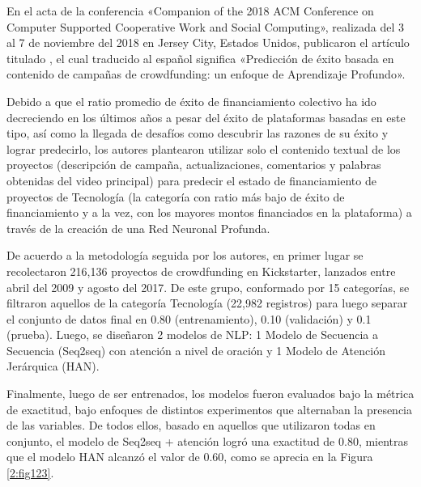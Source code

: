 En el acta de la conferencia «Companion of the 2018 ACM Conference on Computer Supported Cooperative Work and Social Computing», realizada  del 3 al 7 de noviembre del 2018 en Jersey City, Estados Unidos, \cite{pr_lee2018contentDL} publicaron el artículo titulado , el cual traducido al español significa «Predicción de éxito basada en contenido de campañas de crowdfunding: un enfoque de Aprendizaje Profundo».

Debido a que el ratio promedio de éxito de financiamiento colectivo ha ido decreciendo en los últimos años a pesar del éxito de plataformas basadas en este tipo, así como la llegada de desafíos como descubrir las razones de su éxito y lograr predecirlo, los autores plantearon utilizar solo el contenido textual de los proyectos (descripción de campaña, actualizaciones, comentarios y palabras obtenidas del video principal) para predecir el estado de financiamiento de proyectos de Tecnología (la categoría con ratio más bajo de éxito de financiamiento y a la vez, con los mayores montos financiados en la plataforma) a través de la creación de una Red Neuronal Profunda.

De acuerdo a la metodología seguida por los autores, en primer lugar se recolectaron 216,136 proyectos de crowdfunding en Kickstarter, lanzados entre abril del 2009 y agosto del 2017. De este grupo, conformado por 15 categorías, se filtraron aquellos de la categoría Tecnología (22,982 registros) para luego separar el conjunto de datos final en 0.80 (entrenamiento), 0.10 (validación) y 0.1 (prueba). Luego, se diseñaron 2 modelos de NLP: 1 Modelo de Secuencia a Secuencia (Seq2seq) con atención a nivel de oración y 1 Modelo de Atención Jerárquica (HAN).

Finalmente, luego de ser entrenados, los modelos fueron evaluados bajo la métrica de exactitud, bajo enfoques de distintos experimentos que alternaban la presencia de las variables. De todos ellos, basado en aquellos que utilizaron todas en conjunto, el modelo de Seq2seq + atención logró una exactitud de 0.80, mientras que el modelo HAN alcanzó el valor de 0.60, como se aprecia en la Figura \ref{2:fig123}.

